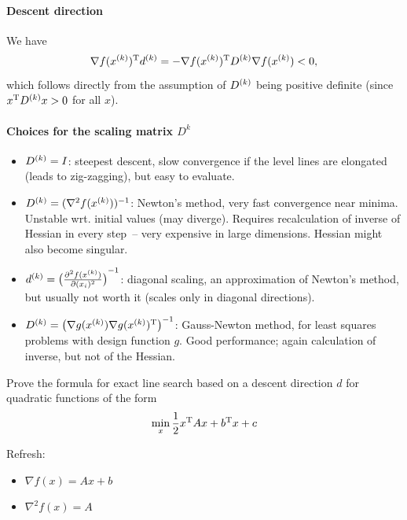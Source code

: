 \documentclass[12pt,a4paper]{article}
\begin{document}
\paragraph{Descent direction}
We have
  \begin{equation*}
    \nabla f(x^{(k)})^{\mathrm{T}} d^{(k)} = -\nabla f(x^{(k)})^{\mathrm{T}} D^{(k)} \nabla f(x^{(k)}) < 0,
  \end{equation*}
  which follows directly from the assumption of \(D^{(k)}\) being positive definite (since
  \(x^{\mathrm{T}}D^{(k)}x > 0\) for all \(x\)). 
  
\paragraph{Choices for the scaling matrix $D^{k}$}
  \begin{itemize}
\item \(D^{(k)} = I\): steepest descent, slow convergence if the level lines are elongated (leads to
  zig-zagging), but easy to evaluate.
\item \(D^{(k)} = (\nabla^2 f(x^{(k)}))^{-1}\): Newton's method, very fast convergence near minima.
  Unstable wrt. initial values (may diverge).  Requires recalculation of inverse of Hessian in
  every step~-- very expensive in large dimensions.  Hessian might also become singular.
\item \(\kth{d} = \del[1]{\pd[2]{f(\kth{x})}{(x_i)}}^{-1}\): diagonal scaling, an approximation of
  Newton's method, but usually not worth it (scales only in diagonal directions).
\item $\kth{D} = \del[1]{\nabla g(\kth{x}) \T{\nabla g(\kth{x})}}^{-1}$: Gauss-Newton method, for
  least squares problems with design function \(g\). Good performance; again calculation of inverse,
  but not of the Hessian.
\end{itemize}

\begin{question}
Prove the formula for exact line search based on a descent direction $d$ for quadratic functions of the form
\begin{equation*}
     \min_x \dfrac{1}{2} x^{\mathrm{T}} Ax + b^{\mathrm{T}}x + c
\end{equation*}
\end{question}

Refresh:
\begin{itemize}
    \item $\nabla f(x) = Ax + b$
    \item $\nabla^2 f(x) = A$
\end{itemize}
\end{document}
